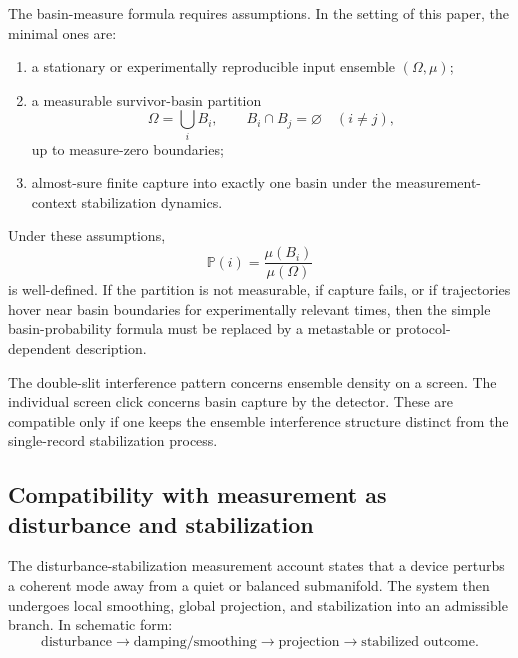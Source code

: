 \documentclass[11pt]{article}
\begin{document}
The basin-measure formula requires assumptions. In the setting of this paper, the minimal
ones are:
\begin{enumerate}[label=(\roman*)]
  \item a stationary or experimentally reproducible input ensemble \((\Omega,\mu)\);
  \item a measurable survivor-basin partition
  \begin{equation}
    \Omega=\bigcup_i B_i,
    \qquad
    B_i\cap B_j=\varnothing\quad(i\neq j),
  \end{equation}
  up to measure-zero boundaries;
  \item almost-sure finite capture into exactly one basin under the measurement-context
  stabilization dynamics.
\end{enumerate}
Under these assumptions,
\begin{equation}
  \mathbb P(i)=\frac{\mu(B_i)}{\mu(\Omega)}
\end{equation}
is well-defined. If the partition is not measurable, if capture fails, or if trajectories hover
near basin boundaries for experimentally relevant times, then the simple basin-probability
formula must be replaced by a metastable or protocol-dependent description.

\begin{remark}
\label{rem:basin-capture-duality}
The double-slit interference pattern concerns ensemble density on a screen. The individual
screen click concerns basin capture by the detector. These are compatible only if one keeps
the ensemble interference structure distinct from the single-record stabilization process.
\end{remark}

\subsection{Compatibility with measurement as disturbance and stabilization}
\label{subsec:compatibility-measurement-disturbance}

The disturbance-stabilization measurement account states that a device perturbs a coherent
mode away from a quiet or balanced submanifold. The system then undergoes local smoothing,
global projection, and stabilization into an admissible branch. In schematic form:
\begin{equation}
  \text{disturbance}
  \longrightarrow
  \text{damping/smoothing}
  \longrightarrow
  \text{projection}
  \longrightarrow
  \text{stabilized outcome}.
  \label{eq:disturbance-stabilization-chain}
\end{equation}
\end{document}
